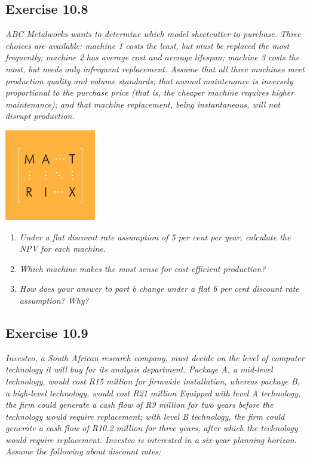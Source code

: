 \documentclass[]{book}
\theoremstyle{definition}
\theoremstyle{definition}
\theoremstyle{remark}
\begin{document}
\subsection{Exercise 10.8}\label{exercise-10.8}

\emph{ABC Metalworks wants to determine which model sheetcutter to
purchase. Three choices are available: machine 1 costs the least, but
must be replaced the most frequently; machine 2 has average cost and
average lifespan; machine 3 costs the most, but needs only infrequent
replacement. Assume that all three machines meet production quality and
volume standards; that annual maintenance is inversely proportional to
the purchase price (that is, the cheaper machine requires higher
maintenance); and that machine replacement, being instantaneous, will
not disrupt production.} \citep[p.340]{book}

\begin{center}\includegraphics[width=150px]{figures/matrix} \end{center}

\begin{enumerate}
\def\labelenumi{\alph{enumi}.}
\item
  \emph{Under a flat discount rate assumption of 5 per cent per year,
  calculate the NPV for each machine.} \citep[p.340]{book}
\item
  \emph{Which machine makes the most sense for cost-efficient
  production?} \citep[p.340]{book}
\item
  \emph{How does your answer to part b change under a flat 6 per cent
  discount rate assumption? Why?} \citep[p.340]{book}
\end{enumerate}

\subsection{Exercise 10.9}\label{exercise-10.9}

\emph{Investco, a South African research company, must decide on the
level of computer technology it will buy for its analysis department.
Package A, a mid-level technology, would cost R15 million for firmwide
installation, whereas package B, a high-level technology, would cost R21
million Equipped with level A technology, the firm could generate a cash
flow of R9 million for two years before the technology would require
replacement; with level B technology, the firm could generate a cash
flow of R10.2 million for three years, after which the technology would
require replacement. Investco is interested in a six-year planning
horizon. Assume the following about discount rates:} \citep[p.340]{book}
\end{document}
